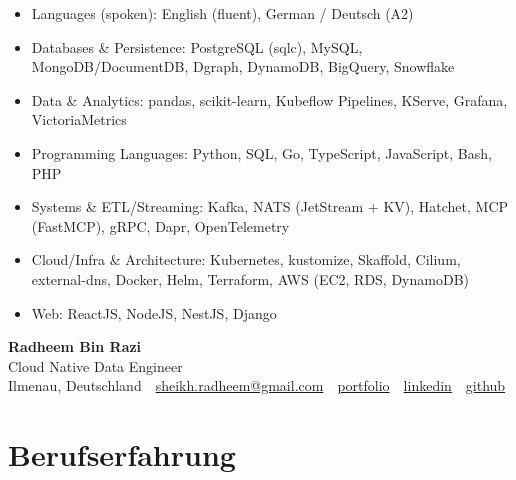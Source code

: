 \documentclass[10pt,a4paper]{resume}
\makeatletter
\newcommand{\Portfolio}{https://radheem.github.io/my-cv}
\newcommand{\PortfolioText}{portfolio}
\newcommand{\GitHub}{https://github.com/radheem}
\newcommand{\LinkedIn}{https://www.linkedin.com/in/radheem-razi}
\newcommand{\Email}{sheikh.radheem@gmail.com}
\makeatother
\begin{document}
\begin{itemize}[leftmargin=1.4em,nosep,topsep=2pt]
  \item Languages (spoken): English (fluent), German / Deutsch (A2)
  \item Databases \& Persistence: PostgreSQL (sqlc), MySQL, MongoDB/DocumentDB, Dgraph, DynamoDB, BigQuery, Snowflake
  \item Data \& Analytics: pandas, scikit-learn, Kubeflow Pipelines, KServe, Grafana, VictoriaMetrics
  \item Programming Languages: Python, SQL, Go, TypeScript, JavaScript, Bash, PHP
  \item Systems \& ETL/Streaming: Kafka, NATS (JetStream + KV), Hatchet, MCP (FastMCP), gRPC, Dapr, OpenTelemetry
  \item Cloud/Infra \& Architecture: Kubernetes, kustomize, Skaffold, Cilium, external-dns, Docker, Helm, Terraform, AWS (EC2, RDS, DynamoDB)
  \item Web: ReactJS, NodeJS, NestJS, Django
\end{itemize}

\clearpage
{}

\begin{center}
  {\huge\bfseries Radheem Bin Razi}\\[3pt]
  {\large Cloud Native Data Engineer}\\[6pt]
  \small
  Ilmenau, Deutschland \,\textbar\,
  \href{mailto:\Email}{\Email} \,\textbar\,
  \href{\Portfolio}{\PortfolioText} \,\textbar\,
  \href{\LinkedIn}{linkedin} \,\textbar\,
  \href{\GitHub}{github}
\end{center}
\vspace{2pt}

\section{Berufserfahrung}
\end{document}
